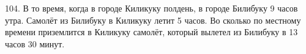 104. В то время, когда в городе Киликуку полдень, в городе Билибуку 9 часов утра. Самолёт из Билибуку в Киликуку летит 5 часов. Во сколько по местному времени приземлится в Киликуку самолёт, который вылетел из Билибуку в 13 часов 30 минут.\\
